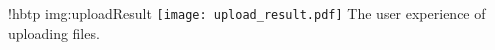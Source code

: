 \namedfigure
{!hbtp}
{img:uploadResult}
{\texttt{[image: upload\_result.pdf]}}
{The user experience of uploading files.}
